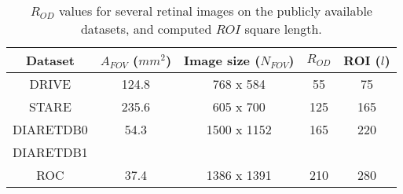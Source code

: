 \begin{table}[h]
\small
\centering

\begin{tabular}{|c|c|c|c|c|}
\hline
\textbf{Dataset} & \textbf{$A_{FOV}$} ($mm^2$)& \textbf{Image size} ($N_{FOV}$) & \textbf{$R_{OD}$} & \textbf{ROI ($l$)} \\
\hline
DRIVE \citep{drive} & 124.8 & 768 x 584 & 55 & 75 \\
\hline
STARE \citep{stare} & 235.6 & 605 x 700 & 125 & 165 \\
\hline
DIARETDB0 \citep{diaretdb0} & 54.3 & 1500 x 1152 & 165 & 220 \\
DIARETDB1 \citep{diaretdb1} & {} & {} & {} & {} \\
\hline
ROC \citep{roc} & 37.4 & 1386 x 1391 & 210 & 280 \\
\hline
\end{tabular}

\caption{\label{tableau_fov}$R_{OD}$ values for several retinal images on the publicly available datasets, and computed $ROI$ square length.}
\end{table}